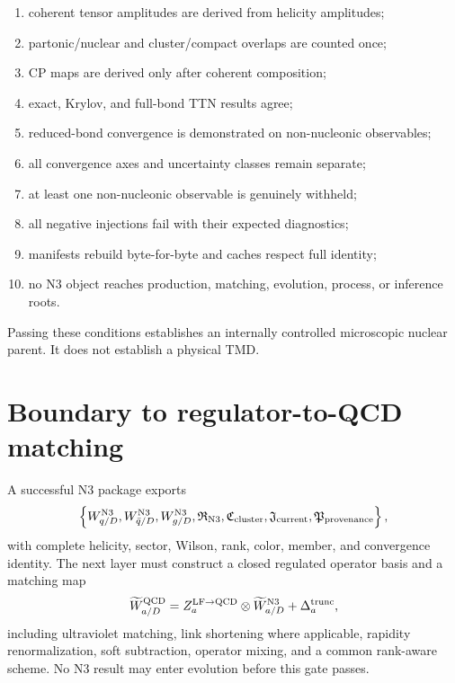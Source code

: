 \documentclass[11pt]{article}
\newcommand{\LF}{\ensuremath{\mathrm{LF}}}
\newcommand{\QCD}{\ensuremath{\mathrm{QCD}}}
\begin{document}
\begin{enumerate}
\item coherent tensor amplitudes are derived from helicity amplitudes;
\item partonic/nuclear and cluster/compact overlaps are counted once;
\item CP maps are derived only after coherent composition;
\item exact, Krylov, and full-bond TTN results agree;
\item reduced-bond convergence is demonstrated on non-nucleonic observables;
\item all convergence axes and uncertainty classes remain separate;
\item at least one non-nucleonic observable is genuinely withheld;
\item all negative injections fail with their expected diagnostics;
\item manifests rebuild byte-for-byte and caches respect full identity;
\item no N3 object reaches production, matching, evolution, process, or inference roots.
\end{enumerate}
Passing these conditions establishes an internally controlled microscopic nuclear parent.  It does not establish a physical TMD.

\section{Boundary to regulator-to-QCD matching}
\label{sec:matching-boundary}

A successful N3 package exports
\begin{equation}
 \left
 \{
 W_{q/D}^{\rm N3},
 W_{\bar q/D}^{\rm N3},
 W_{g/D}^{\rm N3},
 \mathfrak R_{\rm N3},
 \mathfrak C_{\rm cluster},
 \mathfrak J_{\rm current},
 \mathfrak P_{\rm provenance}
 \right
 \},
\label{eq:n3-matching-handoff}
\end{equation}
with complete helicity, sector, Wilson, rank, color, member, and convergence identity.  The next layer must construct a closed regulated operator basis and a matching map
\begin{equation}
 \widetilde W_{a/D}^{\QCD}
 =Z_{a}^{\LF\to\QCD}
 \otimes
 \widetilde W_{a/D}^{\rm N3}
 +\Delta_{a}^{\rm trunc},
\label{eq:n3-lf-qcd}
\end{equation}
including ultraviolet matching, link shortening where applicable, rapidity renormalization, soft subtraction, operator mixing, and a common rank-aware scheme.  No N3 result may enter evolution before this gate passes.
\end{document}
